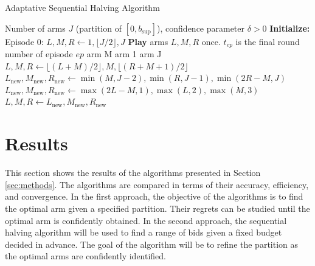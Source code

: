 \documentclass{statsmsc}
\begin{document}
\begin{algorithm}[H]
  \caption{Adaptative Sequential Halving Algorithm}
  \label{alg:SHA}
    \begin{algorithmic}
      \Require Number of arms $J$ (partition of $[0, b_{\sup}]$), confidence parameter $\delta>0$
      \State \textbf{Initialize:} Episode 0: $L, M, R \gets1,\lfloor J/2 \rfloor,  J$
        \State \textbf{Play} arms $L, M, R$ once.
        \State $t_{ep}$ is the final round number of episode $ep$
          \State \Return arm M 
          \EndIf
          \State \Return arm 1 
          \EndIf
          \State \Return arm J 
          \EndIf
        \EndIf
         
          \State $L, M, R \gets \lfloor (L + M)/2\rfloor, M, \lfloor (R + M + 1)/2\rfloor$
        \EndIf
         
          \State $L_{\text{new}}, M_{\text{new}}, R_{\text{new}} \gets \min(M, J-2), \min(R, J-1), \min(2R - M, J)$
        \EndIf
         
          \State $L_{\text{new}}, M_{\text{new}}, R_{\text{new}} \gets \max(2 L - M, 1), \max(L, 2), \max(M, 3)$
        \EndIf
        \State $L, M , R \gets L_{\text{new}}, M_{\text{new}}, R_{\text{new}}$
      \EndFor
     \end{algorithmic}

  \end{algorithm}
\section{Results}

This section shows the results of the algorithms presented in Section \ref{sec:methods}. The algorithms are compared in terms of their accuracy, efficiency, and convergence. 
In the first approach, the objective of the algorithms is to find the optimal arm given a specified partition. Their regrets can be studied until the optimal arm is confidently obtained. 
In the second approach, the sequential halving algorithm will be used to find a range of bids given a fixed budget decided in advance. 
The goal of the algorithm will be to refine the partition as the optimal arms are confidently identified.
\end{document}
